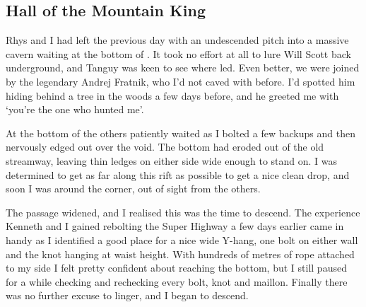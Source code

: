 \subsection{Hall of the Mountain King}
\begin{marginfigure}
\end{marginfigure}
Rhys and I had left the previous day with an undescended pitch into a massive cavern waiting at the bottom of . It took no effort at all to lure Will Scott back underground, and Tanguy was keen to see where  led. Even better, we were joined by the legendary Andrej Fratnik, who I'd not caved with before. I'd spotted him hiding behind a tree in the woods a few days before, and he greeted me with `you're the one who hunted me'.
 
At the bottom of  the others patiently waited as I bolted a few backups and then nervously edged out over the void. The bottom had eroded out of the old streamway, leaving thin ledges on either side wide enough to stand on. I was determined to get as far along this rift as possible to get a nice clean drop, and soon I was around the corner, out of sight from the others.  
 
The passage widened, and I realised this was the time to descend. The experience Kenneth and I gained rebolting the Super Highway a few days earlier came in handy as I identified a good place for a nice wide Y-hang, one bolt on either wall and the knot hanging at waist height. With hundreds of metres of rope attached to my side I felt pretty confident about reaching the bottom, but I still paused for a while checking and rechecking every bolt, knot and maillon. Finally there was no further excuse to linger, and I began to descend.
 
